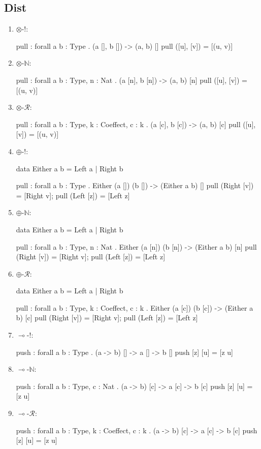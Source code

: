 \subsection{Dist}
\begin{enumerate}
\item $\otimes$-!:
\begin{granule}
pull : forall { a b : Type } . (a [], b []) -> (a, b) []
pull ([u], [v]) = [(u, v)]
\end{granule}
\item $\otimes$-$\mathbb{N}$:
\begin{granule}
pull : forall {a b : Type, n : Nat} 
     . (a [n], b [n]) 
     -> (a, b) [n]
pull ([u], [v]) = [(u, v)]
\end{granule}
\item $\otimes$-$\mathcal{R}$:
\begin{granule}
pull : forall {a b : Type, k : Coeffect, c : k} 
     . (a [c], b [c]) 
     -> (a, b) [c]
pull ([u], [v]) = [(u, v)]
\end{granule}
\item $\oplus$-!:
\begin{granule}
data Either a b = Left a | Right b

pull : forall { a b : Type }
     . Either (a []) (b []) 
     -> (Either a b) []
pull (Right [v]) = [Right v];
pull (Left [z]) = [Left z]
\end{granule}
\item $\oplus$-$\mathbb{N}$:
\begin{granule}
data Either a b = Left a | Right b

pull : forall {a b : Type, n : Nat} 
     . Either (a [n]) (b [n]) 
     -> (Either a b) [n]
pull (Right [v]) = [Right v];
pull (Left [z]) = [Left z]
\end{granule}
\item $\oplus$-$\mathcal{R}$:
\begin{granule}
data Either a b = Left a | Right b

pull : forall { a b : Type, k : Coeffect, c : k } 
     . Either (a [c]) (b [c]) 
     -> (Either a b) [c]
pull (Right [v]) = [Right v];
pull (Left [z]) = [Left z]
\end{granule}
\item $\multimap$-!:
\begin{granule}
push : forall { a b : Type }
     . (a -> b) [] 
     -> a [] 
     -> b []
push [z] [u] = [z u]
\end{granule}
\item $\multimap$-$\mathbb{N}$:
\begin{granule}
push : forall {a b : Type, c : Nat}
     . (a -> b) [c] 
     -> a [c] 
     -> b [c]
push [z] [u] = [z u]
\end{granule}
\item $\multimap$-$\mathcal{R}$:
\begin{granule}
push : forall { a b : Type, k : Coeffect, c : k } 
     . (a -> b) [c] 
     -> a [c] 
     -> b [c]
push [z] [u] = [z u]
\end{granule}
\end{enumerate}

